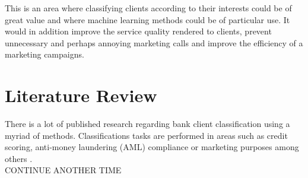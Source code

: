 	\noindent This is an area where classifying clients according to their 
	interests could be of great value and where machine learning methods could 
	be of particular use. It would in addition improve the service quality 
	rendered to clients, prevent unnecessary and perhaps annoying marketing 
	calls and improve the efficiency of a marketing campaigns.
	
	\section{Literature Review}

	There is a lot of published research regarding bank client classification
	using a myriad of methods. Classifications tasks are performed in areas
	such as credit scoring, anti-money laundering (AML) compliance or marketing
	purposes among others
	\citep{sukharev2020ews,weber2018scalable,moro2014data}. \\

	CONTINUE ANOTHER TIME



